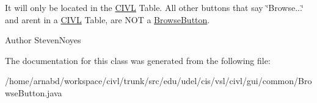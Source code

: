 It will only be located in the \hyperlink{classedu_1_1udel_1_1cis_1_1vsl_1_1civl_1_1CIVL}{C\+I\+V\+L} Table. All other buttons that say \char`\"{}\+Browse...\char`\"{} and aren\textquotesingle{}t in a \hyperlink{classedu_1_1udel_1_1cis_1_1vsl_1_1civl_1_1CIVL}{C\+I\+V\+L} Table, are N\+O\+T a \hyperlink{classedu_1_1udel_1_1cis_1_1vsl_1_1civl_1_1gui_1_1common_1_1BrowseButton}{Browse\+Button}.

\begin{DoxyAuthor}{Author}
Steven\+Noyes 
\end{DoxyAuthor}


The documentation for this class was generated from the following file\+:\begin{DoxyCompactItemize}
\item 
/home/arnabd/workspace/civl/trunk/src/edu/udel/cis/vsl/civl/gui/common/Browse\+Button.\+java\end{DoxyCompactItemize}

